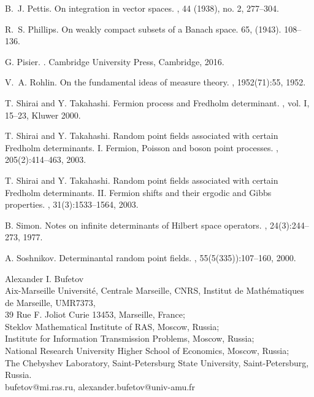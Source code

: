 \documentclass[12pt]{paper}
\numberwithin{theorem}{section}
\numberwithin{figure}{section}
\numberwithin{equation}{section}
\begin{document}
\begin{thebibliography}{10}
B.~J. Pettis.
\newblock  On integration in vector spaces.
,  44 (1938), no. 2, 277--304.

R.~S. Phillips.
\newblock On weakly compact subsets of a Banach space.
 65, (1943). 108--136.


G. Pisier.
.
\newblock Cambridge University Press, Cambridge, 2016.

V.~A. Rohlin.
\newblock On the fundamental ideas of measure theory.
, 1952(71):55, 1952.

 T. Shirai and Y. Takahashi.
\newblock Fermion process and Fredholm determinant.
, vol. I, 15--23, Kluwer 2000.


T. Shirai and Y. Takahashi.
\newblock Random point fields associated with certain {F}redholm determinants.
  {I}. {F}ermion, {P}oisson and boson point processes.
, 205(2):414--463, 2003.

T. Shirai and Y. Takahashi.
\newblock Random point fields associated with certain {F}redholm determinants.
  {II}. {F}ermion shifts and their ergodic and {G}ibbs properties.
, 31(3):1533--1564, 2003.

B. Simon.
\newblock Notes on infinite determinants of {H}ilbert space operators.
, 24(3):244--273, 1977.

A. Soshnikov.
\newblock Determinantal random point fields.
, 55(5(335)):107--160, 2000.


\end{thebibliography}










\bigbreak
\noindent Alexander I. Bufetov\\
\noindent  Aix-Marseille Universit{\'e}, Centrale Marseille, CNRS, Institut de Math{\'e}matiques de Marseille, UMR7373, \\
  39 Rue F. Joliot Curie 13453, Marseille, France; \\
\noindent Steklov  Mathematical Institute of RAS, Moscow, Russia;\\
\noindent Institute for Information Transmission Problems, Moscow, Russia; \\
\noindent National Research University Higher School of Economics, Moscow, Russia;\\
\noindent The Chebyshev Laboratory, Saint-Petersburg State University, Saint-Petersburg, Russia.\\
\noindent  bufetov@mi.ras.ru, alexander.bufetov@univ-amu.fr
\end{document}
